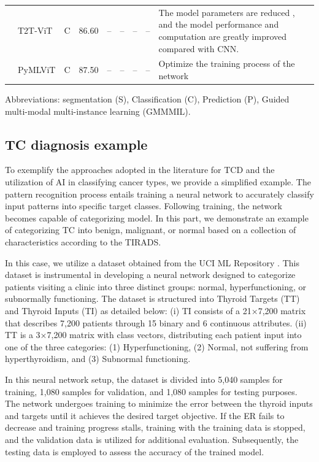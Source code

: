 \documentclass[a4paper,fleqn]{cas-sc}
\begin{document}
\begin{table}[tbph]
\begin{center}
\begin{tabular}{
m{0.4cm}
m{2cm}
m{0.5cm}
m{0.5cm}
m{0.5cm}
m{0.5cm}
m{0.5cm}
m{0.5cm}
m{7cm}
}
\cite{yin2022pyramid} & 
T2T-ViT &
C & 
86.60&
--&
--&
--&
--&
The model parameters are reduced , and the model performance and computation are greatly improved compared with CNN. \\ \addlinespace

\cite{yu2023pyramid} & 
PyMLViT & C &  87.50& --& --& --& --& Optimize the training process of the network\\


\hline 
\end{tabular}%
\begin{flushleft}
Abbreviations: segmentation (S), Classification (C),  Prediction (P), Guided
multi-modal multi-instance learning (GMMMIL).   
\end{flushleft}
\end{center}
\end{table}

\subsection{\ac{TC} diagnosis example} \label{sec6}
To exemplify the approaches adopted in the literature for \ac{TCD} and the utilization of \ac{AI} in classifying cancer types, we provide a simplified example. The pattern recognition process entails training a neural network to accurately classify input patterns into specific target classes. Following training, the network becomes capable of categorizing model. In this part, we demonstrate an example of categorizing TC into benign, malignant, or normal based on a collection of characteristics according to the \ac{TIRADS}.

In this case, we utilize a dataset obtained from the UCI \ac{ML} Repository \cite{murphy1994uci}. This dataset is instrumental in developing a neural network designed to categorize patients visiting a clinic into three distinct groups: normal, hyperfunctioning, or subnormally functioning.   The dataset is structured into Thyroid Targets (TT) and Thyroid Inputs (TI) as detailed below: (i) TI consists of a 21×7,200 matrix that describes 7,200 patients through 15 binary and 6 continuous attributes. (ii) TT is a 3×7,200 matrix with class vectors, distributing each patient input into one of the three categories: (1) Hyperfunctioning, (2) Normal, not suffering from hyperthyroidism, and (3) Subnormal functioning.

In this neural network setup, the dataset is divided into 5,040 samples for training, 1,080 samples for validation, and 1,080 samples for testing purposes. The network undergoes training to minimize the error between the thyroid inputs and targets until it achieves the desired target objective. If the \ac{ER} fails to decrease and training progress stalls, training with the training data is stopped, and the validation data is utilized for additional evaluation. Subsequently, the testing data is employed to assess the accuracy of the trained model.
\end{document}
